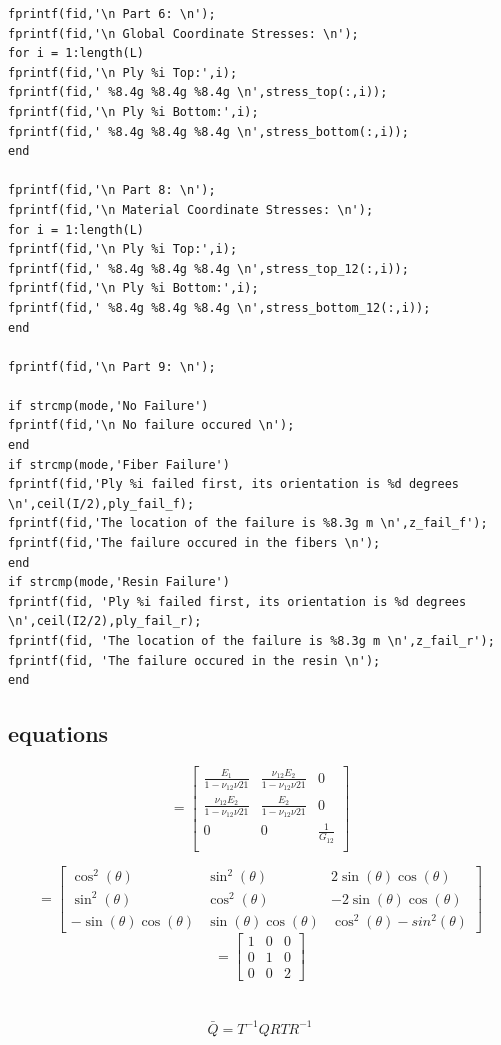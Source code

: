 \documentclass[12pt]{article}
\begin{document}
\begin{verbatim}
fprintf(fid,'\n Part 6: \n');
fprintf(fid,'\n Global Coordinate Stresses: \n');
for i = 1:length(L)
fprintf(fid,'\n Ply %i Top:',i); 
fprintf(fid,' %8.4g %8.4g %8.4g \n',stress_top(:,i));
fprintf(fid,'\n Ply %i Bottom:',i); 
fprintf(fid,' %8.4g %8.4g %8.4g \n',stress_bottom(:,i));
end

fprintf(fid,'\n Part 8: \n');
fprintf(fid,'\n Material Coordinate Stresses: \n');
for i = 1:length(L)
fprintf(fid,'\n Ply %i Top:',i); 
fprintf(fid,' %8.4g %8.4g %8.4g \n',stress_top_12(:,i));
fprintf(fid,'\n Ply %i Bottom:',i); 
fprintf(fid,' %8.4g %8.4g %8.4g \n',stress_bottom_12(:,i));
end

fprintf(fid,'\n Part 9: \n');

if strcmp(mode,'No Failure')
fprintf(fid,'\n No failure occured \n');
end
if strcmp(mode,'Fiber Failure')
fprintf(fid,'Ply %i failed first, its orientation is %d degrees \n',ceil(I/2),ply_fail_f);
fprintf(fid,'The location of the failure is %8.3g m \n',z_fail_f');
fprintf(fid,'The failure occured in the fibers \n');
end
if strcmp(mode,'Resin Failure')
fprintf(fid, 'Ply %i failed first, its orientation is %d degrees \n',ceil(I2/2),ply_fail_r);
fprintf(fid, 'The location of the failure is %8.3g m \n',z_fail_r');
fprintf(fid, 'The failure occured in the resin \n');
end
\end{verbatim}

\subsection{equations}


\begin{equation}
[Q]=\left[\begin{matrix}
\frac{E_1}{1-\nu_{12}\nu{21}}&\frac{\nu_{12}E_2}{1-\nu_{12}\nu{21}}&0\\
\frac{\nu_{12}E_2}{1-\nu_{12}\nu{21}}&\frac{E_2}{1-\nu_{12}\nu{21}}&0\\
0&0&\frac{1}{G_{12}}\\
\end{matrix}\right]
\end{equation}

\begin{equation}
[T]=\left[\begin{matrix}
\cos^2(\theta)& \sin^2(\theta) & 2\sin(\theta)\cos(\theta)\\
 \sin^2(\theta) & \cos^2(\theta)& -2\sin(\theta)\cos(\theta)\\
 -\sin(\theta)\cos(\theta)&\sin(\theta)\cos(\theta)&\cos^2(\theta)-sin^2(\theta)
\end{matrix}\right]
\end{equation}
\begin{equation}
[R]=\left[\begin{matrix}
1 & 0 & 0\\ 0 & 1 & 0\\ 0& 0 &2
\end{matrix}\right]
\end{equation}
\\ \\
\begin{equation}
\bar{Q}=T^{-1} Q R T R^{-1}
\end{equation}
\end{document}
